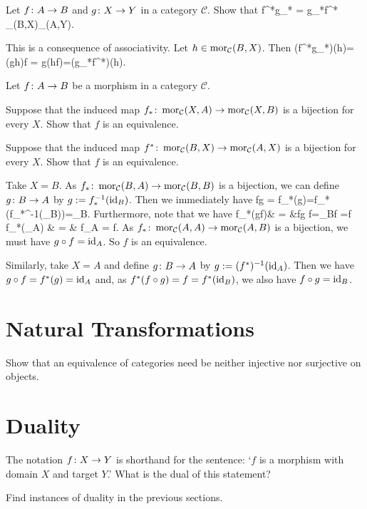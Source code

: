 \bp
Let $f\colon A \to B$ and $g\colon X\to Y$ in a category $\mathcal{C}$. Show that
\bse
f^*\circ g_* = g_*\circ f^* \cl \mor_{}(B,X)\to \mor_{}(A,Y).
\ese
\ep

\bs
This is a consequence of associativity. Let $h\in \operatorname{mor}_{\mathcal{C}}(B,X)$. Then
(f^*\circ g_*)(h)=(g\circ h)\circ f = g\circ (h\circ f)=(g_*\circ f^*)(h).
\ei
\es

\bp
Let $f\colon A \to B$ be a morphism in a category $\mathcal{C}$.
\ben[label=(\alph*)]
\item Suppose that the induced map $f_* \colon \operatorname{mor}_{\mathcal{C}}(X,A)\to \operatorname{mor}_{\mathcal{C}}(X,B)$ is a bijection for every $X$. Show that $f$ is an equivalence.
\item Suppose that the induced map $f^* \colon \operatorname{mor}_{\mathcal{C}}(B,X)\to \operatorname{mor}_{\mathcal{C}}(A,X)$ is a bijection for every $X$. Show that $f$ is an equivalence.
\een
\ep

\bs
\ben[label=(\alph*)]
\item Take $X=B$. As $f_*\colon \operatorname{mor}_{\mathcal{C}}(B,A)\to \operatorname{mor}_{\mathcal{C}}(B,B)$ is a bijection, we can define $g\colon B\to A$ by $g:=f_*^{-1}(\mathrm{id}_B)$. Then we immediately have
\bse
f\circ g = f_*(g)=f_*(f_*^{-1}(\id_B))=\id_B.
\ese
Furthermore, note that we have
f_*(g\circ f)& = &f\circ g \circ f=\id_B\circ f =f\\
f_*(\id_A) & = & f\circ \id_A = f.
\ei
As $f_*\colon \operatorname{mor}_{\mathcal{C}}(A,A)\to \operatorname{mor}_{\mathcal{C}}(A,B)$ is a bijection, we must have $g\circ f=\mathrm{id}_A$. So $f$ is an equivalence.
\item Similarly, take $X=A$ and define $g\colon B\to A$ by $g:=(f^*)^{-1}(\mathrm{id}_A)$. Then we have $g\circ f=f^*(g)=\mathrm{id}_A$ and, as $f^*(f\circ g)=f=f^*(\mathrm{id}_B)$, we also have $f\circ g=\mathrm{id}_B$.
\een
\es


\section{Natural Transformations}

\bx
Show that an equivalence of categories need be neither injective nor surjective on objects.
\ex

\bs
\es

\section{Duality}

\bx
\ben[label=(\alph*)]
\item The notation $f \colon X \to Y$ is shorthand for the sentence: `$f$ is a morphism with domain $X$ and target $Y$.' What is the dual of this statement?
\item Find instances of duality in the previous sections.
\een
\ex

